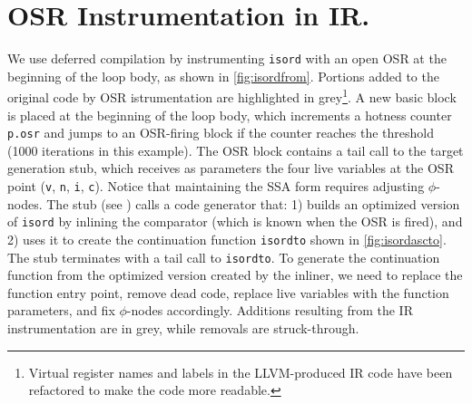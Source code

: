 \section{OSR Instrumentation in IR.}
\label{se:ir-osr-instr}
We use deferred compilation by instrumenting {\tt isord} with an open OSR at the beginning of the loop body, as shown in \myfigure\ref{fig:isordfrom}. Portions added to the original code by OSR istrumentation are highlighted in grey\footnote{Virtual register names and labels in the LLVM-produced IR code have been refactored to make the code more readable.}.
A new basic block is placed at the beginning of the loop body, which increments a hotness counter {\tt p.osr} and jumps to an OSR-firing block if the counter reaches the threshold (1000 iterations in this example). The OSR block contains a tail call to the target generation stub, which receives as parameters the four live variables at the OSR point ({\tt v}, {\tt n}, {\tt i}, {\tt c}). Notice that maintaining the SSA form requires adjusting $\phi$-nodes. The stub (see \myfigure[...]) calls a code generator that: 1) builds an optimized version of {\tt isord} by inlining the comparator (which is known when the OSR is fired), and 2) uses it to create the continuation function {\tt isordto} shown in \myfigure\ref{fig:isordascto}. The stub terminates with a tail call to {\tt isordto}. To generate the continuation function from the optimized version created by the inliner, we need to replace the function entry point, remove dead code, replace live variables with the function parameters, and fix $\phi$-nodes accordingly. Additions resulting from the IR instrumentation are in grey, while removals are struck-through.


